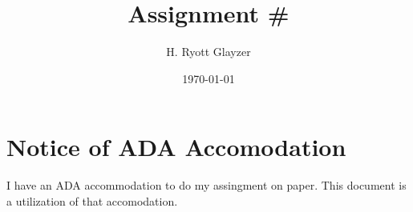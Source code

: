 \documentclass[11pt, letterpaper]{article}
\begin{document}


\title{Assignment #}
\author{H. Ryott Glayzer}
\date{\today}


\maketitle


\section*{Notice of ADA Accomodation}
I have an ADA accommodation to do my assingment on paper.
This document is a utilization of that accomodation.
\end{document}
